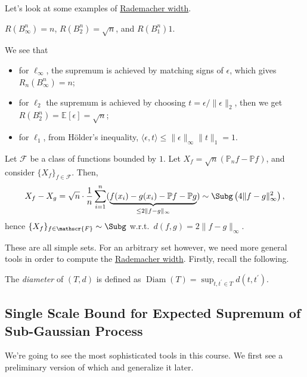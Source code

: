 Let's look at some examples of \hyperref[def:Rademacher-width]{Rademacher width}.

\begin{eg}
	\(R(B_\infty ^n) = n\), \(R(B_2^n)= \sqrt{n} \), and \(R(B_1^n) 1\).
\end{eg}
\begin{explanation}
	We see that
	\begin{itemize}
		\item for \(\ell _\infty \), the supremum is achieved by matching signs of \(\epsilon \), which gives \(R_n(B_\infty ^n) = n\);
		\item for \(\ell _2\) the supremum is achieved by choosing \(t = \epsilon / \lVert \epsilon \rVert _2\), then we get \(R(B_2^n) = \mathbb{E}_{}\left[\epsilon \right] = \sqrt{n} \);
		\item for \(\ell _1\), from Hölder's inequality, \(\langle \epsilon , t \rangle \leq \lVert \epsilon \rVert _\infty \lVert t \rVert _1 = 1\).
	\end{itemize}
\end{explanation}

\begin{eg}\label{eg:supremum-of-empirical-process}
	Let \(\mathscr{F} \) be a class of functions bounded by \(1\). Let \(X_f = \sqrt{n} (\mathbb{P} _n f - \mathbb{P} f)\), and consider \(\{ X_f \}_{f\in \mathscr{F} } \). Then,
	\[
		X_f - X_g
		= \sqrt{n} \cdot \frac{1}{n}\sum_{i=1}^{n} ( \underbrace{f(x_i) - g(x_i) - \mathbb{P} f - \mathbb{P} g }_{\leq 2 \lVert f-g \rVert _\infty })
		\sim \Subg\left( 4 \lVert f - g \rVert _\infty ^2 \right) ,
	\]
	hence \(\{ X_f \} _{f\in \mathscr{F} } \sim \Subg\) w.r.t.\ \(d(f, g) = 2\lVert f - g \rVert _\infty\).
\end{eg}

These are all simple sets. For an arbitrary set however, we need more general tools in order to compute the \hyperref[def:Rademacher-width]{Rademacher width}. Firstly, recall the following.

\begin{definition}[Diameter]\label{def:diameter}
	The \emph{diameter} of \((T, d)\) is defined as \(\mathop{\mathrm{Diam}}(T) = \sup _{t, t^{\prime} \in T} d(t, t^{\prime} )\).
\end{definition}

\subsection{Single Scale Bound for Expected Supremum of Sub-Gaussian Process}
We're going to see the most sophisticated tools in this course. We first see a preliminary version of which and generalize it later.

